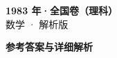 \documentclass[zihao=-4, a4paper]{ctexart}
\begin{document}
\begin{center}
  {\Large\bfseries 1983 年·全国卷（理科）}\\[4pt]
  {\large 数学 · 解析版}
\end{center}
\medskip
{}

\clearpage
{}
\begin{center}{\Large\bfseries 参考答案与详细解析}\end{center}
\medskip

\end{document}
